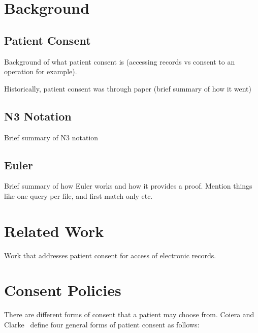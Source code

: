 \documentclass[conference]{IEEEtran}
\begin{document}
\section{Background}
\label{bg-sec}

\subsection{Patient Consent}
\label{pat-consent}
Background of what patient consent is (accessing records vs consent to an operation for example).

Historically, patient consent was through paper (brief summary of how it went)


\subsection{N3 Notation}

Brief summary of N3 notation

\subsection{Euler}

Brief summary of how Euler works and how it provides a proof. Mention things like one query per file, and first match only etc.


\section{Related Work}
\label{rel-work}

Work that addresses patient consent for access of electronic records.


\section{Consent Policies}
\label{cons-polic}

There are different forms of consent that a patient may choose from. Coiera and Clarke~\cite{coiera2004consent} define four general forms of patient consent as
follows:
\end{document}
